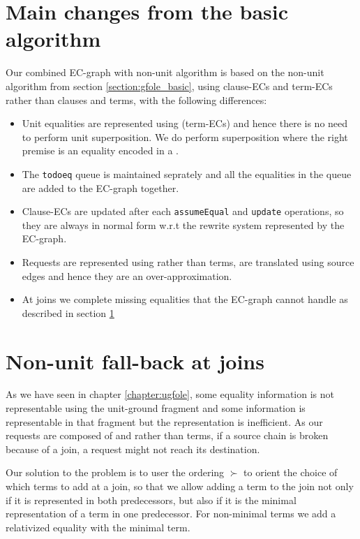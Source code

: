 \bigskip 

\section*{Main changes from the basic algorithm}
Our combined EC-graph with non-unit algorithm is based on the non-unit algorithm from section \ref{section:gfole_basic}, using clause-ECs and term-ECs rather than clauses and terms, with the following differences:
\begin{itemize}
	\item Unit equalities are represented using \GTs{} (term-ECs) and hence there is no need to perform unit superposition. 
	We do perform superposition where the right premise is an equality encoded in a \GT{}.
	\item The \lstinline|todoeq| queue is maintained seprately and all the equalities in the queue are added to the EC-graph together.
	\item Clause-ECs are updated after each \lstinline|assumeEqual| and \lstinline|update| operations, so they are always in normal form w.r.t the rewrite system represented by the EC-graph.
	\item Requests are represented using \GFAs{} rather than terms, are translated using source edges and hence they are an over-approximation.
	\item At joins we complete missing equalities that the EC-graph cannot handle as described in section \ref{section:gfole:EC-graphs:non_unit_fallback}
\end{itemize}

\section{Non-unit fall-back at joins}\label{section:gfole:EC-graphs:non_unit_fallback}
As we have seen in chapter \ref{chapter:ugfole}, some equality information is not representable using the unit-ground fragment and some information is representable in that fragment but the representation is inefficient. As our requests are composed of \GFAs{} and \GTs{} rather than terms, if a source chain is broken because of a join, a request might not reach its destination.

Our solution to the problem is to user the ordering $\succ$ to orient the choice of which terms to add at a join, so that we allow adding a term to the join not only if it is represented in both predecessors, but also if it is the minimal representation of a term in one predecessor. For non-minimal terms we add a relativized equality with the minimal term.

